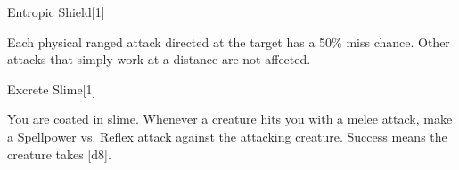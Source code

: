 \begin{spellsection}{Entropic Shield}[1]
    \begin{spellheader}
    \end{spellheader}
    \begin{spellcontent}
        \begin{spelltargetinginfo}
        \end{spelltargetinginfo}
        \begin{spelleffects}
            \spelleffect Each physical ranged attack directed at the target has a 50\% miss chance. Other attacks that simply work at a distance are not affected.
            \spelldur \durshort \dismissable
        \end{spelleffects}
    \end{spellcontent}
    \begin{spellfooter}
        \miscastrandom
    \end{spellfooter}
    \begin{spellaugments}
    \end{spellaugments}
\end{spellsection}

\begin{spellsection}{Excrete Slime}[1]
    \begin{spellheader}
    \end{spellheader}
    \begin{spellcontent}
        \begin{spelltargetinginfo}
        \end{spelltargetinginfo}
        \begin{spelleffects}
            \spelleffect You are coated in slime. Whenever a creature hits you with a melee attack, make a Spellpower vs. Reflex attack against the attacking creature. Success means the creature takes [d8].
            \spelldur \durshort
        \end{spelleffects}
    \end{spellcontent}
    \begin{spellfooter}
        \miscastexplode
    \end{spellfooter}
    \begin{spellaugments}
    \end{spellaugments}
\end{spellsection}

